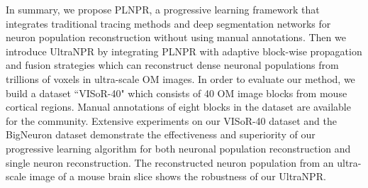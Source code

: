 In summary, we propose PLNPR, a progressive learning framework that integrates traditional tracing methods and deep segmentation networks for neuron population reconstruction without using manual annotations.
%
Then we introduce UltraNPR by integrating PLNPR with adaptive block-wise propagation and fusion strategies which can reconstruct dense neuronal populations from trillions of voxels in ultra-scale OM images. 
%
In order to evaluate our method, we build a dataset ``VISoR-40" which consists of 40 OM image blocks from mouse cortical regions. Manual annotations of eight blocks in the dataset are available for the community. Extensive experiments on our VISoR-40 dataset and the BigNeuron dataset demonstrate the effectiveness and superiority of our progressive learning algorithm for both neuronal population reconstruction and single neuron reconstruction.
The reconstructed neuron population from an ultra-scale image of a mouse brain slice shows the robustness of our UltraNPR.




